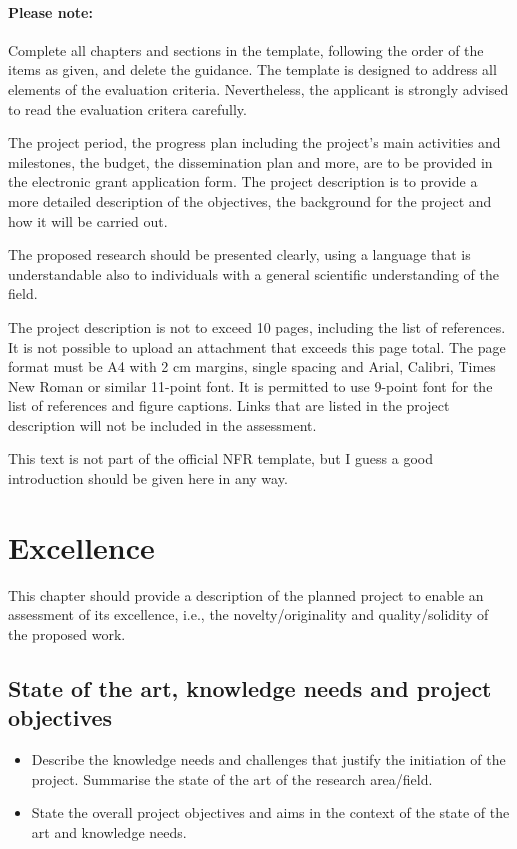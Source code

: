 \documentclass[11pt,a4paper,british]{article}
\title{\mytitle}
\begin{document}
\paragraph{Please note:}
Complete all chapters and sections in the template, following the order of the
items as given, and delete the guidance. The template is designed to address
all elements of the evaluation criteria. Nevertheless, the applicant is
strongly advised to read the evaluation critera carefully.

The project period, the progress plan including the project's main activities
and milestones, the budget, the dissemination plan and more, are to be provided
in the electronic grant application form. The project description is to provide
a more detailed description of the objectives, the background for the project
and how it will be carried out.

The proposed research should be presented clearly, using a language that is
understandable also to individuals with a general scientific understanding of
the field.

The project description is not to exceed 10 pages, including the list of
references.  It is not possible to upload an attachment that exceeds this page
total. The page format must be A4 with 2 cm margins, single spacing and Arial,
Calibri, Times New Roman or similar 11-point font. It is permitted to use
9-point font for the list of references and figure captions. Links that are
listed in the project description will not be included in the assessment.

\maketitle

\noindent This text is not part of the official NFR template, but I guess a
good introduction should be given here in any way.

\section{Excellence}
This chapter should provide a description of the planned project to enable an
assessment of its excellence, i.e., the novelty/originality and
quality/solidity of the proposed work.

\subsection{State of the art, knowledge needs and project objectives}
\begin{itemize}
    \item Describe the knowledge needs and challenges that justify the initiation of the project.
        Summarise the state of the art of the research area/field.
    \item State the overall project objectives and aims in the context of the
        state of the art and knowledge needs.
\end{itemize}
\end{document}
